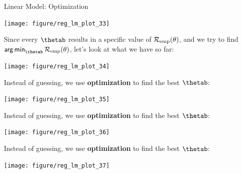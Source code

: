 \documentclass[11pt,compress,t,notes=noshow, xcolor=table]{beamer}
\newenvironment{knitrout}{}{} %
\begin{document}
\begin{vbframe}{Linear Model: Optimization}
\begin{knitrout}
{\centering \texttt{[image: figure/reg\_lm\_plot\_33]} 

}



\end{knitrout}


\framebreak


Since every $\thetab$ results in a specific value of $\mathcal{R}_{\text{emp}}(\theta)$, and we try
to find $\argmin_{\thetab} \risket$, let's look at what we have so far:

\lz

\begin{knitrout}\scriptsize
{}\color{fgcolor}

{\centering \texttt{[image: figure/reg\_lm\_plot\_34]} 

}



\end{knitrout}

\framebreak

Instead of guessing, we use \textbf{optimization} to find the best $\thetab$:
\begin{knitrout}\scriptsize
{}\color{fgcolor}

{\centering \texttt{[image: figure/reg\_lm\_plot\_35]} 

}



\end{knitrout}

\framebreak

Instead of guessing, we use \textbf{optimization} to find the best $\thetab$:
\begin{knitrout}\scriptsize
{}\color{fgcolor}

{\centering \texttt{[image: figure/reg\_lm\_plot\_36]} 

}



\end{knitrout}

\framebreak

Instead of guessing, we use \textbf{optimization} to find the best $\thetab$:

\begin{knitrout}\scriptsize
{}\color{fgcolor}

{\centering \texttt{[image: figure/reg\_lm\_plot\_37]} 

}
\end{knitrout}
\end{vbframe}
\end{document}
